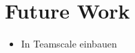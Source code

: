 
\chapter{Future Work}\label{chapter:future}

\begin{itemize}
	\item In Teamscale einbauen
\end{itemize}